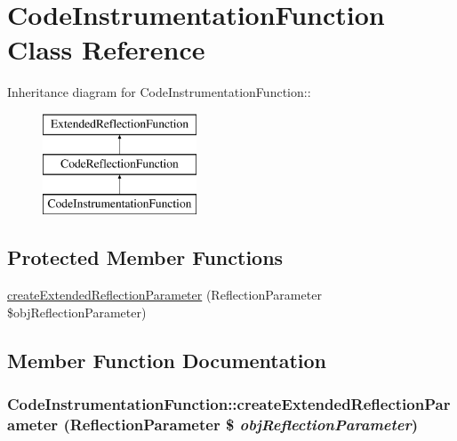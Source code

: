\hypertarget{class_code_instrumentation_function}{
\section{CodeInstrumentationFunction Class Reference}
\label{class_code_instrumentation_function}
}
Inheritance diagram for CodeInstrumentationFunction::\begin{figure}[H]
\begin{center}
\leavevmode
\includegraphics[height=3cm]{class_code_instrumentation_function}
\end{center}
\end{figure}
\subsection*{Protected Member Functions}
\begin{CompactItemize}
\item 
\hyperlink{class_code_instrumentation_function_3d95491ac661050b8e8ecedfaf3c8359}{createExtendedReflectionParameter} (ReflectionParameter \$objReflectionParameter)
\end{CompactItemize}


\subsection{Member Function Documentation}
\hypertarget{class_code_instrumentation_function_3d95491ac661050b8e8ecedfaf3c8359}{
\subsubsection[{createExtendedReflectionParameter}]{\setlength{\rightskip}{0pt plus 5cm}CodeInstrumentationFunction::createExtendedReflectionParameter (ReflectionParameter \$ {\em objReflectionParameter})}}
\label{class_code_instrumentation_function_3d95491ac661050b8e8ecedfaf3c8359}


